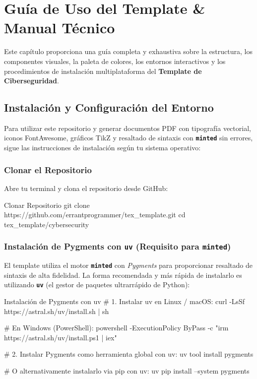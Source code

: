 \documentclass[../../main_compilation.tex]{subfiles}
\begin{document}
\chapter{Guía de Uso del Template \& Manual Técnico}
\label{chap:manual_template}

Este capítulo proporciona una guía completa y exhaustiva sobre la estructura, los componentes visuales, la paleta de colores, los entornos interactivos y los procedimientos de instalación multiplataforma del \textbf{Template de Ciberseguridad}.

\chaptertoc

\section{Instalación y Configuración del Entorno}
Para utilizar este repositorio y generar documentos PDF con tipografía vectorial, iconos FontAwesome, gráficos TikZ y resaltado de sintaxis con \textbf{\texttt{minted}} sin errores, sigue las instrucciones de instalación según tu sistema operativo:

\subsection{Clonar el Repositorio}
Abre tu terminal y clona el repositorio desde GitHub:
\begin{bashbox}{Clonar Repositorio}
	git clone https://github.com/errantprogrammer/tex_template.git
	cd tex_template/cybersecurity
\end{bashbox}

\subsection{Instalación de Pygments con \texttt{uv} (Requisito para \texttt{minted})}
El template utiliza el motor \textbf{\texttt{minted}} con \textit{Pygments} para proporcionar resaltado de sintaxis de alta fidelidad. La forma recomendada y más rápida de instalarlo es utilizando \textbf{\texttt{uv}} (el gestor de paquetes ultrarrápido de Python):

\begin{bashbox}{Instalación de Pygments con uv}
	# 1. Instalar uv en Linux / macOS:
	curl -LsSf https://astral.sh/uv/install.sh | sh

	# En Windows (PowerShell):
	powershell -ExecutionPolicy ByPass -c "irm https://astral.sh/uv/install.ps1 | iex"

	# 2. Instalar Pygments como herramienta global con uv:
	uv tool install pygments

	# O alternativamente instalarlo via pip con uv:
	uv pip install --system pygments
\end{bashbox}
\end{document}
